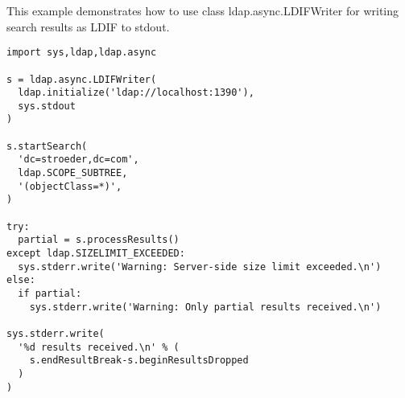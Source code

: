 This example demonstrates how to use class ldap.async.LDIFWriter
for writing search results as LDIF to stdout.

\begin{verbatim}
import sys,ldap,ldap.async

s = ldap.async.LDIFWriter(
  ldap.initialize('ldap://localhost:1390'),
  sys.stdout
)

s.startSearch(
  'dc=stroeder,dc=com',
  ldap.SCOPE_SUBTREE,
  '(objectClass=*)',
)

try:
  partial = s.processResults()
except ldap.SIZELIMIT_EXCEEDED:
  sys.stderr.write('Warning: Server-side size limit exceeded.\n')
else:
  if partial:
    sys.stderr.write('Warning: Only partial results received.\n')

sys.stderr.write(
  '%d results received.\n' % (
    s.endResultBreak-s.beginResultsDropped
  )
)
\end{verbatim}

